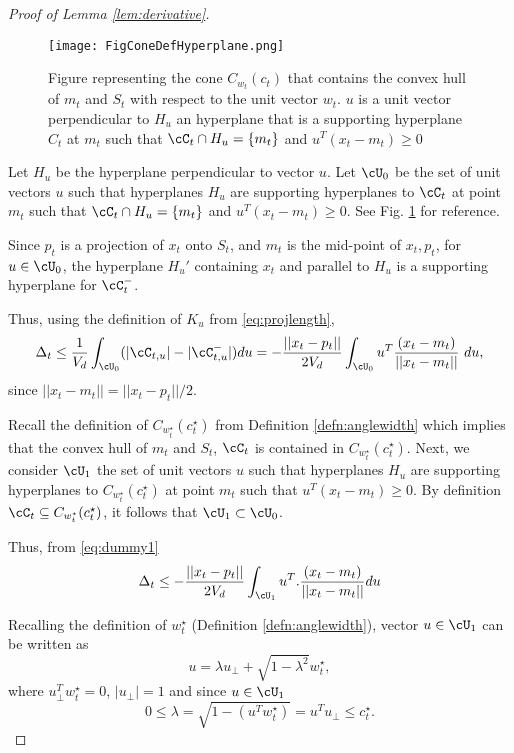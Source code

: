\begin{proof}[Proof of Lemma \ref{lem:derivative}]
\begin{figure*}
\begin{center}
\texttt{[image: FigConeDefHyperplane.png]}
\caption{Figure representing the cone $C_{w_t}(c_t)$ that contains the convex hull of $m_t$ and $S_{t}$ with respect to the unit vector $w_t$. $u$ is a unit vector perpendicular to $H_u$ an hyperplane that is a supporting hyperplane $C_t$ at $m_t$ such that $\cC_t \cap H_u = \{m_t\}$ and 
$u^T (x_t-m_t)\ge 0$ }
\label{fig:anglewidth}
\end{center}
\end{figure*}



Let $H_u$ be the hyperplane perpendicular to vector $u$.
 Let $\cU_0$ be the set of unit vectors $u$ such that hyperplanes $H_u$ are supporting hyperplanes to $\cC_t$ at point $m_t$ such that $\cC_t \cap H_u = \{m_t\}$ and 
$u^T (x_t-m_t)\ge 0$.  See Fig. \ref{fig:anglewidth} for reference.

 Since $p_t$ is a projection of $x_t$ onto $S_{t}$, and $m_t$ is the mid-point of $x_t,p_t$, for $u\in \cU_0$, the hyperplane $H_u'$ containing $x_t$ and parallel to $H_u$ is a supporting hyperplane for $\cC_t^-$.  


Thus, using the definition of $K_u$ from \eqref{eq:projlength},
\begin{equation}\label{eq:dummy1}
\Delta_t  \le \frac{1}{V_d} \int_{\cU_0} (|\cC_{t,u}| - |\cC_{t,u}^-|) du= -\frac{||x_t-p_t||}{2V_d} \int_{\cU_0} u^T 
\frac{(x_t-m_t)}{||x_t-m_t||}  \ du,
\end{equation}
since $||x_t-m_t|| = ||x_t-p_t||/2$.

Recall the definition of $C_{w_t^\star}(c_t^\star)$ from Definition \ref{defn:anglewidth} which implies that the convex hull of $m_t$ and $S_{t}$, $\cC_t$ is contained in $C_{w_t^\star}(c_t^\star)$.
Next, we consider $\cU_1$ the set of unit vectors $u$ such that hyperplanes $H_u$ are supporting hyperplanes to $C_{w_t^\star}(c_t^\star)$ at point $m_t$ 
such that $u^T (x_t-m_t)\ge 0$. 
By definition $\cC_t\subseteq C_{w_t^\star}(c_t^\star)$, it follows that 
$\cU_1\subset \cU_0$.

Thus, from \eqref{eq:dummy1}
 \begin{equation}\label{eq:dummy2}
\Delta_t  \le -\frac{||x_t-p_t||}{2V_d} \int_{\cU_1} u^T. \frac{(x_t-m_t)}{||x_t-m_t||} du
\end{equation}

Recalling the definition of $w_t^\star$ (Definition \ref{defn:anglewidth}), 
vector $u\in \cU_1$ can be written as 
$$ u = \lambda u_{\perp} + \sqrt{1-\lambda^2} w_t^\star,$$
where $u_{\perp}^T w_t^\star=0$, $|u_{\perp}|=1$ and since $u\in \cU_1$
$$0 \le \lambda=\sqrt{1-(u^Tw_t^\star)} = u^Tu_{\perp}\le c_t^\star.$$


\end{proof}
